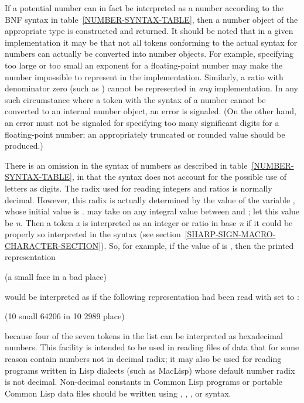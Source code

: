 If a potential number can in fact
be interpreted as a number according to the BNF
syntax in table~\ref{NUMBER-SYNTAX-TABLE}, then a number object of the
appropriate type is constructed and returned.  It should be noted that in
a given implementation it may be that not all tokens conforming to the
actual syntax for numbers can actually be converted into number objects.
For example, specifying too large or too small an exponent for a floating-point
number may make the number impossible to represent in the implementation.
Similarly, a ratio with denominator zero (such as )
cannot be represented in \emph{any} implementation.
In any such circumstance where
a token with the syntax of a number cannot be converted to an internal
number object, an error is signaled.  (On the other hand, an error
must not be signaled for specifying too many significant digits
for a floating-point number; an appropriately truncated or rounded
value should be produced.)

There is an omission in the syntax of numbers
as described in table~\ref{NUMBER-SYNTAX-TABLE},
in that the syntax does not account for the possible
use of letters as digits.
The radix used for reading integers and ratios is normally decimal.
However, this radix is actually determined by the value of
the variable , whose initial value is .
 may take on any integral value between  and ;
let this value be \emph{n}.  Then a token \emph{x} is interpreted as
an integer or ratio in base \emph{n} if it could be properly
so interpreted in the syntax 
(see section~\ref{SHARP-SIGN-MACRO-CHARACTER-SECTION}).
So, for example, if the value of  is ,
then the printed representation
\begin{lisp}
(a small face in a bad place)
\end{lisp}
would be interpreted as if the following representation had
been read with  set to :
\begin{lisp}
(10 small 64206 in 10 2989 place)
\end{lisp}
because four of the seven tokens in the list can be interpreted
as hexadecimal numbers.  This facility is intended to be used
in reading files of data that for some reason contain numbers
not in decimal radix; it may also be used for reading programs
written in Lisp dialects (such as MacLisp) whose default number radix is not
decimal.  Non-decimal constants in Common Lisp programs
or portable Common Lisp data files should be written using
, , , or  syntax.

